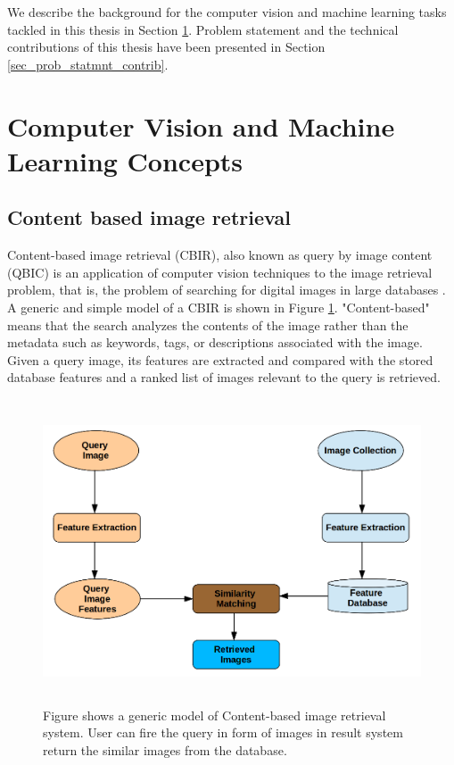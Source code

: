 We describe the background for the computer vision and machine learning tasks tackled in this thesis in Section \ref{sec:cv_ml_task}.
Problem statement and the technical contributions of this thesis have been presented in Section \ref{sec_prob_statmnt_contrib}.

\section{Computer Vision and Machine Learning Concepts} 
\label{sec:cv_ml_task}
\subsection{Content based image retrieval}
Content-based image retrieval (CBIR), also known as query by image content (QBIC) is an application of computer vision techniques to the image retrieval problem, that is, the problem of searching for digital images in large databases \cite{smeulders2000content}. A generic and simple model of a CBIR is shown in Figure \ref{fig:cbir}.
"Content-based" means that the search analyzes the contents of the image rather than the metadata such as keywords, tags, or descriptions associated with the image. Given a query image, its features are extracted and compared with the stored database features and a ranked list of images relevant to the query is retrieved.\\
\begin{figure}
\includegraphics[width=\columnwidth,height=9cm]{figures/img_retrieval.png}
\caption{Figure shows a generic model of Content-based image retrieval system. User can fire the query in form of images in result system return the similar images from the database.}
\label{fig:cbir}
\end{figure}
